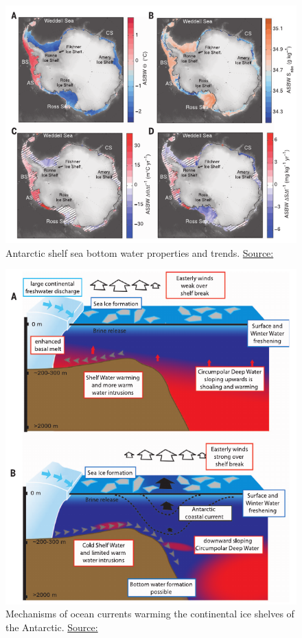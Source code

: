 \documentclass{beamer}
\begin{document}
\begin{frame}
\begin{figure}
\includegraphics[width=\linewidth]{./Images/Schmidtko_ASBW_2014.png}
\caption{\label{fig:SchmidtkoASBW} Antarctic shelf sea bottom water properties and trends. \href{http://science.sciencemag.org/content/346/6214/1227}{\tiny Source: \citep{schmidtko2014multidecadal} }}
\end{figure}
\end{frame}


\begin{frame}
\begin{figure}
\includegraphics[width=0.7\linewidth]{./Images/SchmidtkoIllustration_2014.png}
\caption{\label{fig:SchmidtkoIllustration} Mechanisms of ocean currents warming the continental ice shelves of the Antarctic. \href{http://science.sciencemag.org/content/346/6214/1227}{\tiny Source: \citep{schmidtko2014multidecadal} }}
\end{figure}
\end{frame}
\end{document}
